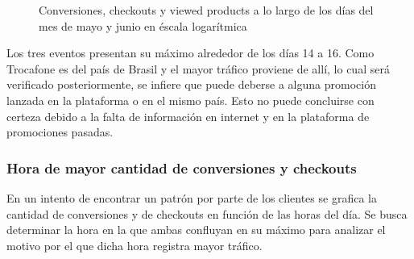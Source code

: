 \documentclass[a4paper]{article}
\begin{document}
\begin{figure}[h!]
	\caption{Conversiones, checkouts y viewed products a lo largo de los días del mes de mayo y junio en éscala logarítmica}
	\label{mayojunio}
\end{figure}

Los tres eventos presentan su máximo alrededor de los días 14 a 16. Como Trocafone es del país de Brasil y el mayor tráfico proviene de allí, lo cual será verificado posteriormente, se infiere que puede deberse a alguna promoción lanzada en la plataforma o en el mismo país. Esto no puede concluirse con certeza debido a la falta de información en internet y en la plataforma de promociones pasadas.

\subsubsection{Hora de mayor cantidad de conversiones y checkouts}

En un intento de encontrar un patrón por parte de los clientes se grafica la cantidad de conversiones y de checkouts en función de las horas del día. Se busca determinar la hora en la que ambas confluyan en su máximo para analizar el motivo por el que dicha hora registra mayor tráfico.
\end{document}

